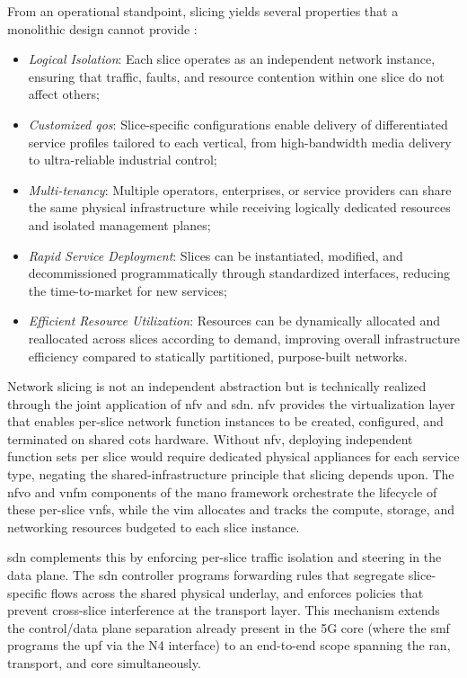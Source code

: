 From an operational standpoint, slicing yields several properties that a monolithic design cannot provide \cite{3GPP5GSystemarchitecture5GSystem2026}:
\begin{itemize}
    \item \emph{Logical Isolation}: Each slice operates as an independent network instance, ensuring that traffic, faults, and resource contention within one slice do not affect others;
    \item \emph{Customized \ac{qos}}: Slice-specific configurations enable delivery of differentiated service profiles tailored to each vertical, from high-bandwidth media delivery to ultra-reliable industrial control;
    \item \emph{Multi-tenancy}: Multiple operators, enterprises, or service providers can share the same physical infrastructure while receiving logically dedicated resources and isolated management planes;
    \item \emph{Rapid Service Deployment}: Slices can be instantiated, modified, and decommissioned programmatically through standardized interfaces, reducing the time-to-market for new services;
    \item \emph{Efficient Resource Utilization}: Resources can be dynamically allocated and reallocated across slices according to demand, improving overall infrastructure efficiency compared to statically partitioned, purpose-built networks.
\end{itemize}

Network slicing is not an independent abstraction but is technically realized through the joint application of \ac{nfv} and \ac{sdn}. \ac{nfv} provides the virtualization layer that enables per-slice network function instances to be created, configured, and terminated on shared \ac{cots} hardware. Without \ac{nfv}, deploying independent function sets per slice would require dedicated physical appliances for each service type, negating the shared-infrastructure principle that slicing depends upon. The \ac{nfvo} and \ac{vnfm} components of the \ac{mano} framework orchestrate the lifecycle of these per-slice \acp{vnf}, while the \ac{vim} allocates and tracks the compute, storage, and networking resources budgeted to each slice instance.

\ac{sdn} complements this by enforcing per-slice traffic isolation and steering in the data plane. The \ac{sdn} controller programs forwarding rules that segregate slice-specific flows across the shared physical underlay, and enforces policies that prevent cross-slice interference at the transport layer. This mechanism extends the control/data plane separation already present in the 5G core (where the \ac{smf} programs the \ac{upf} via the N4 interface) to an end-to-end scope spanning the \ac{ran}, transport, and core simultaneously.

